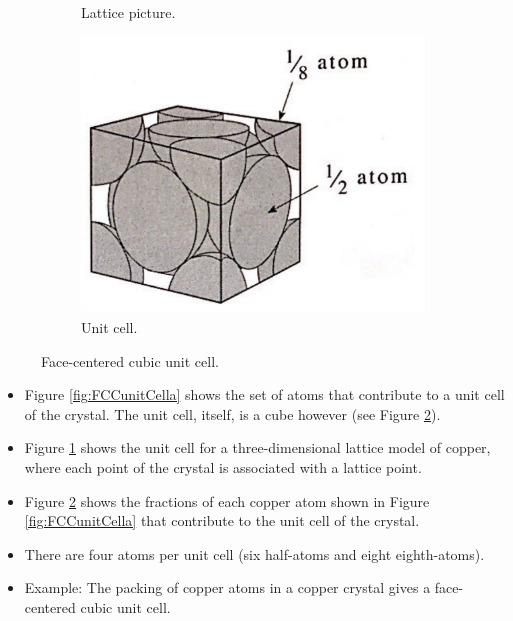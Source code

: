 \documentclass[../notes.tex]{subfiles}
\begin{document}
\begin{itemize}
\begin{figure}[H]
\begin{subfigure}[b]{0.2\linewidth}
            \caption{Lattice picture.}
            \label{fig:FCCunitCellb}
        \end{subfigure}
        \begin{subfigure}[b]{0.2\linewidth}
            \centering
            \includegraphics[width=1.0\linewidth]{../ExtFiles/FCCunitCellc.png}
            \caption{Unit cell.}
            \label{fig:FCCunitCellc}
        \end{subfigure}
        \caption{Face-centered cubic unit cell.}
        \label{fig:FCCunitCell}
    \end{figure}
    \begin{itemize}
        \item Figure \ref{fig:FCCunitCella} shows the set of atoms that contribute to a unit cell of the crystal. The unit cell, itself, is a cube however (see Figure \ref{fig:FCCunitCellc}).
        \item Figure \ref{fig:FCCunitCellb} shows the unit cell for a three-dimensional lattice model of copper, where each point of the crystal is associated with a lattice point.
        \item Figure \ref{fig:FCCunitCellc} shows the fractions of each copper atom shown in Figure \ref{fig:FCCunitCella} that contribute to the unit cell of the crystal.
        \item There are four atoms per unit cell (six half-atoms and eight eighth-atoms).
        \item Example: The packing of copper atoms in a copper crystal gives a face-centered cubic unit cell.
    \end{itemize}

\end{itemize}
\end{document}
